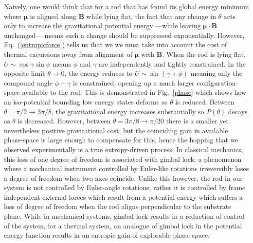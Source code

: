 \documentclass[aps,prl,reprint,twocolumn,superscriptaddress,showpacs]{revtex4-1}
\newcommand{\vcrm}[1]{\mathbf{#1}}
\newcommand{\vc}[1]{\boldsymbol{#1}}
\begin{document}
Naively, one would think that for a rod that has found its global energy minimum where $\vc{\mu}$ is aligned along $\vcrm{B}$ while lying flat, the fact that any change in $\theta$ acts only to increase the gravitational potential energy ---while leaving $\vc{\mu}\cdot\vcrm{B} $ unchanged--- means such a change should be suppressed exponentially. However, Eq.\ (\ref{entropicforce}) tells us that we we must take into account the cost of thermal excursions away from alignment of $\vc{\mu}$ with $\vcrm{B}$. When the rod is lying flat, $U\sim \cos\gamma\sin\phi$ means $\phi$ and $\gamma$ are independently and tightly constrained. In the opposite limit $\theta\rightarrow0$, the energy reduces to $U\sim \sin(\gamma+\phi)$ meaning only the compound angle $\phi+\gamma$ is constrained, opening up a much larger configuration-space available to the rod. This is demonstrated in Fig.\ \ref{phase} which shows how an iso-potential bounding low energy states deforms as $\theta$ is reduced. Between $\theta=\pi/2\rightarrow 3\pi/8$, the gravitational energy increases substantially so $P(\theta)$ decays as $\theta$ is decreased. However, between $\theta=3\pi/8\rightarrow\pi/20$ there is a smaller yet nevertheless positive gravitational cost, but the coinciding gain in available phase-space is large enough to compensate for this, hence the hopping that we observed experimentally is a true entropy-driven process. In classical mechanics, this loss of one degree of freedom is associated with gimbal lock: a phenomenon where a mechanical instrument controlled by Euler-like rotations irreversibly loses a degree of freedom when two axes coincide. Unlike this however, the rod in our system is not controlled by Euler-angle rotations; rather it is controlled by frame independent external forces which result from a potential energy which suffers a loss of degree of freedom when the rod aligns perpendicular to the substrate plane. While in mechanical systems, gimbal lock results in a reduction of control of the system, for a thermal system, an analogue of gimbal lock in the potential energy function results in an entropic gain of explorable phase space.
\end{document}

